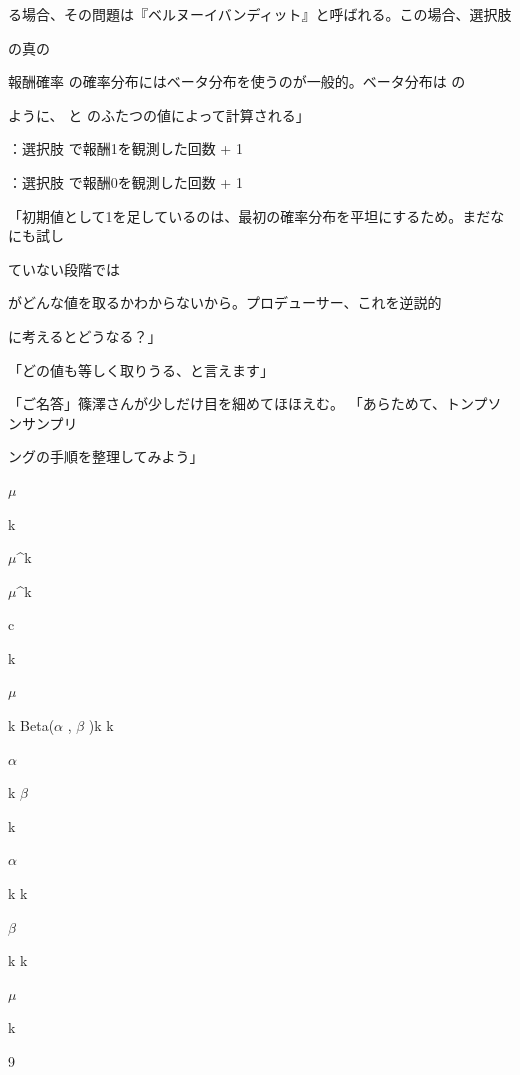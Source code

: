 る場合、その問題は『ベルヌーイバンディット』と呼ばれる。この場合、選択肢\par
の真の\par
報酬確率 の確率分布にはベータ分布を使うのが⼀般的。ベータ分布は の\par
ように、 と のふたつの値によって計算される」\par
：選択肢 で報酬1を観測した回数 + 1\par
：選択肢 で報酬0を観測した回数 + 1\par
「初期値として1を⾜しているのは、最初の確率分布を平坦にするため。まだなにも試し\par
ていない段階では\par
がどんな値を取るかわからないから。プロデューサー、これを逆説的\par
に考えるとどうなる？」\par
「どの値も等しく取りうる、と⾔えます」\par
「ご名答」篠澤さんが少しだけ⽬を細めてほほえむ。 「あらためて、トンプソンサンプリ\par
ングの⼿順を整理してみよう」\par
$\mu$\par
k\par
$\mu$\textasciicircum{}k\par
$\mu$\textasciicircum{}k\par
c\par
k\par
$\mu$\par
k Beta($\alpha$  , $\beta$  )k k\par
$\alpha$\par
k $\beta$\par
k\par
$\alpha$\par
k k\par
$\beta$\par
k k\par
$\mu$\par
k\par
9\par

